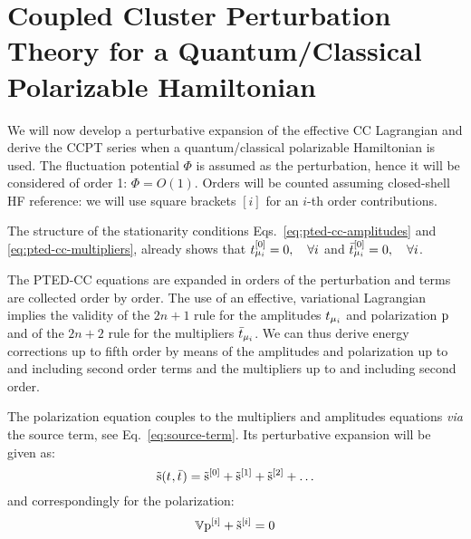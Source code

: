 
\section[Coupled Cluster Perturbation Theory]{
Coupled Cluster Perturbation Theory for a Quantum/Classical Polarizable Hamiltonian}\label{sec:ccpt-polarizable}

We will now develop a perturbative expansion of the effective \acs{CC}
Lagrangian and derive the \acs{CC}\acs{PT} series when a
quantum/classical polarizable Hamiltonian is used.
The fluctuation potential $\Phi$ is assumed as the perturbation, hence
it will be considered of order 1: $\Phi = O(1)$.
Orders will be counted assuming closed-shell \acs{HF} reference:
we will use square brackets $[i]$ for an $i$-th order contributions.

The structure of the stationarity conditions
Eqs.~\eqref{eq:pted-cc-amplitudes} and \eqref{eq:pted-cc-multipliers},
already shows that $t_{\mu_i}^{[0]} = 0, \quad \forall i$ and
$\bar{t}_{\mu_i}^{[0]} = 0, \quad \forall i$.

The \acs{PTED}-\acs{CC} equations are expanded in orders of the
perturbation and terms are collected order by order. The use of an
effective, variational Lagrangian implies the validity of the $2n+1$
rule for the amplitudes $t_{\mu_i}$ and polarization $\mathrm{p}$ and of the
$2n+2$ rule for the multipliers $\bar{t}_{\mu_i}$.
We can thus derive energy corrections up to fifth order by means of the
amplitudes and polarization up to and including second order terms and
the multipliers up to and including second order.

The polarization equation couples to the multipliers and amplitudes
equations \emph{via} the source term, see Eq.~\eqref{eq:source-term}.
Its perturbative expansion will be given as:
\begin{equation}\label{eq:source-term-pt}
  \tilde{\mathrm{s}}(t_{},\bar{t}_{}) =
  \tilde{\mathrm{s}}^{[0]}
  + \tilde{\mathrm{s}}^{[1]}
  + \tilde{\mathrm{s}}^{[2]}
  + \ldots
\end{equation}
and correspondingly for the polarization:
\begin{equation}\label{eq:pol-eq-pt}
  \mathbb{V}\mathrm{p}^{[i]} + \tilde{\mathrm{s}}^{[i]} = 0
\end{equation}

